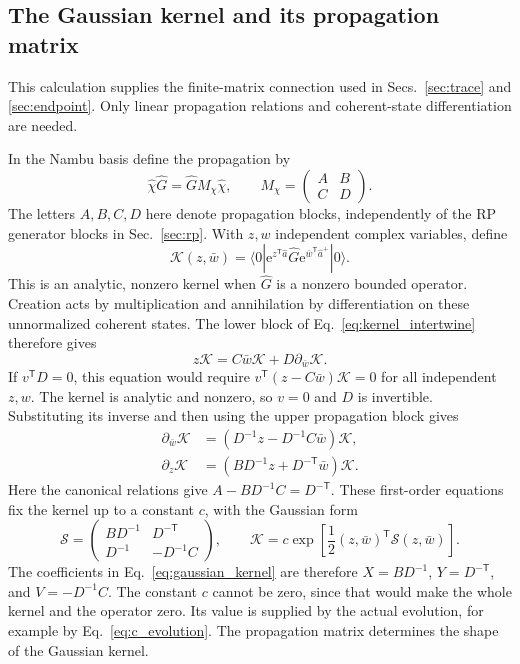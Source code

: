 \documentclass[11pt,a4paper]{article}
\newcommand{\ee}{\mathrm e}
\newcommand{\trans}{\mathsf T}
\numberwithin{equation}{section}
\begin{document}
\subsection{The Gaussian kernel and its propagation matrix}
\label{app:kernel}

This calculation supplies the finite-matrix connection used in
Secs.~\ref{sec:trace} and \ref{sec:endpoint}. Only linear propagation
relations and coherent-state differentiation are needed.

In the Nambu basis define the propagation by
\begin{equation}
 \hat\chi\hat G=\hat G M_\chi\hat\chi,
 \qquad
 M_\chi=\begin{pmatrix}A&B\\C&D\end{pmatrix}.
 \label{eq:kernel_intertwine}
\end{equation}
The letters $A,B,C,D$ here denote propagation blocks, independently of
the RP generator blocks in Sec.~\ref{sec:rp}.
With $z,w$ independent complex variables, define
\begin{equation}
 \mathcal K(z,\bar w)=
 \langle0|\ee^{z^\trans\hat a}\hat G
 \ee^{\bar w^\trans\hat a^+}|0\rangle.
 \label{eq:appendix_kernel}
\end{equation}
This is an analytic, nonzero kernel when $\hat G$ is a nonzero bounded
operator.
Creation acts by multiplication and annihilation by differentiation on
these unnormalized coherent states. The lower block of
Eq.~\eqref{eq:kernel_intertwine} therefore gives
\begin{equation}
 z\mathcal K=C\bar w\mathcal K+D\partial_{\bar w}\mathcal K.
\end{equation}
If $v^\trans D=0$, this equation would require
$v^\trans(z-C\bar w)\mathcal K=0$ for all independent $z,w$.
The kernel is analytic and nonzero, so $v=0$ and $D$ is invertible.
Substituting its inverse and then using the upper propagation block gives
\begin{align}
 \partial_{\bar w}\mathcal K
   &=(D^{-1}z-D^{-1}C\bar w)\mathcal K,\nonumber\\
 \partial_z\mathcal K
   &=(BD^{-1}z+D^{-\trans}\bar w)\mathcal K.
\end{align}
Here the canonical relations give
$A-BD^{-1}C=D^{-\trans}$. These first-order equations fix the kernel
up to a constant $c$, with the Gaussian form
\begin{equation}
 \mathcal S=
 \begin{pmatrix}
 BD^{-1}&D^{-\trans}\\
 D^{-1}&-D^{-1}C
 \end{pmatrix},
 \qquad
 \mathcal K=c\exp\!\left[\frac12
 (z,\bar w)^\trans\mathcal S(z,\bar w)\right].
 \label{eq:kernel_S}
\end{equation}
The coefficients in Eq.~\eqref{eq:gaussian_kernel} are therefore
$X=BD^{-1}$, $Y=D^{-\trans}$, and $V=-D^{-1}C$.
The constant $c$ cannot be zero, since that would make the whole kernel
and the operator zero. Its value is supplied by the actual evolution,
for example by Eq.~\eqref{eq:c_evolution}. The propagation matrix
determines the shape of the Gaussian kernel.
\end{document}
